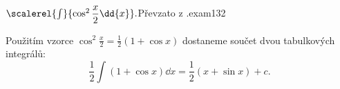 \begin{mathexam}{\(\scalerel{\int}{\cos^2\dfrac{x}{2}\dd{x}}.\)\hfill Převzato z
  \cite[s.~30]{Knichal}.}{exam132} 
  
  Použitím vzorce \(\cos^2\frac{x}{2} = \frac{1}{2}(1+\cos x)\) dostaneme součet dvou tabulkových
  integrálů:
  \begin{equation*}
    \frac{1}{2}\int{(1+\cos x)}\dd{x} = \frac{1}{2}(x+\sin x) + c.
  \end{equation*}
\end{mathexam}